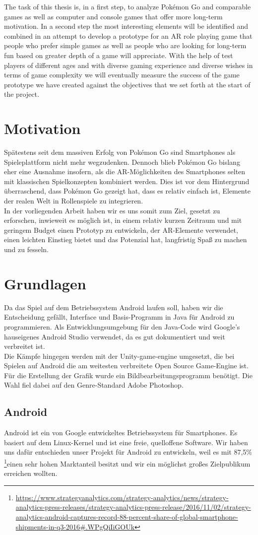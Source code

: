\documentclass[extern,palatino]{cgBA}
\begin{document}
The task of this thesis is, in a first step, to analyze Pokémon Go and comparable games as well as computer and console games that offer more long-term motivation. In a second step the most interesting elements will be identified and combined in an attempt to develop a prototype for an AR role playing game that people who prefer simple games as well as people who are looking for long-term fun based on greater depth of a game will appreciate. With the help of test players of different ages and with diverse gaming experience and diverse wishes in terms of game complexity we will eventually measure the success of the game prototype we have created against the objectives that we set forth at the start of the project.
\newpage
\section{Motivation}
Spätestens seit dem massiven Erfolg von Pokémon Go sind Smartphones als Spieleplattform nicht mehr wegzudenken. Dennoch blieb Pokémon Go bislang eher eine Ausnahme insofern, als die AR-Möglichkeiten des Smartphones selten mit klassischen Spielkonzepten kombiniert werden. Dies ist vor dem Hintergrund überraschend, dass Pokémon Go gezeigt hat, dass es relativ einfach ist, Elemente der realen Welt in Rollenspiele zu integrieren. 
\\In der vorliegenden Arbeit haben wir es uns somit zum Ziel, gesetzt zu erforschen, inwieweit es möglich ist, in einem relativ kurzen Zeitraum und mit geringem Budget einen Prototyp zu entwickeln, der AR-Elemente verwendet, einen leichten Einstieg bietet und das Potenzial hat, langfristig Spaß zu machen und zu fesseln.
\newpage
\section{Grundlagen}
Da das Spiel auf dem Betriebssystem Android laufen soll, haben wir die Entscheidung gefällt, Interface und Basis-Programm in Java für Android zu programmieren. Als Entwicklungsumgebung für den Java-Code wird Google's hauseigenes Android Studio verwendet, da es gut dokumentiert und weit verbreitet ist.
\\Die Kämpfe hingegen werden mit der Unity-game-engine umgesetzt, die bei Spielen auf Android die am weitesten verbreitete Open Source Game-Engine ist. Für die Erstellung der Grafik wurde ein Bildbearbeitungsprogramm benötigt. Die Wahl fiel dabei auf den Genre-Standard Adobe Photoshop.
\subsection{Android}
Android ist ein von Google entwickeltes Betriebssystem für Smartphones. Es basiert auf dem Linux-Kernel und ist eine freie, quelloffene Software. Wir haben uns dafür entschieden unser Projekt für Android zu entwickeln, weil es mit 87,5\% \footnote{\url{https://www.strategyanalytics.com/strategy-analytics/news/strategy-analytics-press-releases/strategy-analytics-press-release/2016/11/02/strategy-analytics-android-captures-record-88-percent-share-of-global-smartphone-shipments-in-q3-2016\#.WPgQiIiGOUk}}einen sehr hohen Marktanteil besitzt und wir ein möglichst großes Zielpublikum erreichen wollten. 
\end{document}
